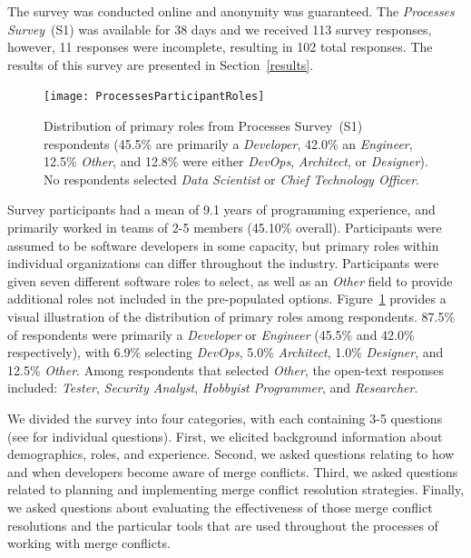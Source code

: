 The survey was conducted online and anonymity was guaranteed.
The \textit{Processes Survey}~(S1) was available for 38 days and we received 113 survey responses, however, 11 responses were incomplete, resulting in 102 total responses.
The results of this survey are presented in Section~\ref{results}.

\begin{figure}[!htbp]
\centering
\hspace*{-0.7cm}\texttt{[image: ProcessesParticipantRoles]}
\caption{Distribution of primary roles from Processes Survey~(S1) respondents (45.5\% are primarily a \textit{Developer}, 42.0\% an \textit{Engineer}, 12.5\% \textit{Other}, and 12.8\% were either \textit{DevOps}, \textit{Architect}, or \textit{Designer}). No respondents selected \textit{Data Scientist} or \textit{Chief Technology Officer}.}
\label{processes_roles}
\end{figure}

Survey participants had a mean of 9.1 years of programming experience, and primarily worked in teams of 2-5 members (45.10\% overall).
Participants were assumed to be software developers in some capacity, but primary roles within individual organizations can differ throughout the industry.
Participants were given seven different software roles to select, as well as an \textit{Other} field to provide additional roles not included in the pre-populated options.
Figure~\ref{processes_roles} provides a visual illustration of the distribution of primary roles among respondents.
87.5\% of respondents were primarily a \textit{Developer} or \textit{Engineer} (45.5\% and 42.0\% respectively), with 6.9\% selecting \textit{DevOps}, 5.0\% \textit{Architect}, 1.0\% \textit{Designer}, and 12.5\% \textit{Other}.
Among respondents that selected \textit{Other}, the open-text responses included: \textit{Tester}, \textit{Security Analyst}, \textit{Hobbyist Programmer}, and \textit{Researcher}.

We divided the survey into four categories, with each containing 3-5 questions (see \cite{companion_site} for individual questions).
First, we elicited background information about demographics, roles, and experience.
Second, we asked questions relating to how and when developers become aware of merge conflicts.
Third, we asked questions related to planning and implementing merge conflict resolution strategies.
Finally, we asked questions about evaluating the effectiveness of those merge conflict resolutions and the particular tools that are used throughout the processes of working with merge conflicts.


